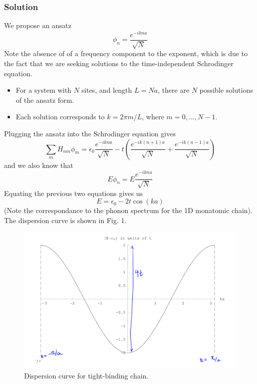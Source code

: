 \documentclass[10pt]{article}
\begin{document}
\subsubsection{Solution}
We propose an ansatz
$$\phi_{n} = \frac{e^{-ikna}}{\sqrt{N}}$$
Note the absence of of a frequency component to the exponent, which is due
to the fact that we are seeking solutions to the time-independent Schrodinger
equation.
\begin{itemize}
  \item For a system with $N$ sites, and length $L = Na$, there are $N$ possible
  solutions of the ansatz form.
  \item Each solution corresponds to $k = 2\pi m/L$, where $m = 0, ..., N-1$.
\end{itemize}
Plugging the ansatz into the Schrodinger equation gives
\begin{equation}
\sum_{m}H_{nm}\phi_{m} = \epsilon_{0}\frac{e^{-ikna}}{\sqrt{N}} - t\left( \frac{e^{-ik(n+1)a}}{\sqrt{N}} + \frac{e^{-ik(n-1)a}}{\sqrt{N}}\right)
\end{equation}
and we also know that
\begin{equation}
  E\phi_{n} = E\frac{e^{-ikna}}{\sqrt{N}}
\end{equation}
Equating the previous two equations gives us
$$
E = \epsilon_{0} - 2t\cos(ka)
$$
(Note the correspondance to the phonon spectrum for the 1D monatomic chain). The dispersion curve is shown in Fig. 1.

\begin{figure}
  \centering
    \includegraphics[width=\textwidth]{tb1}
    \caption{Dispersion curve for tight-binding chain.}
\end{figure}
\end{document}
